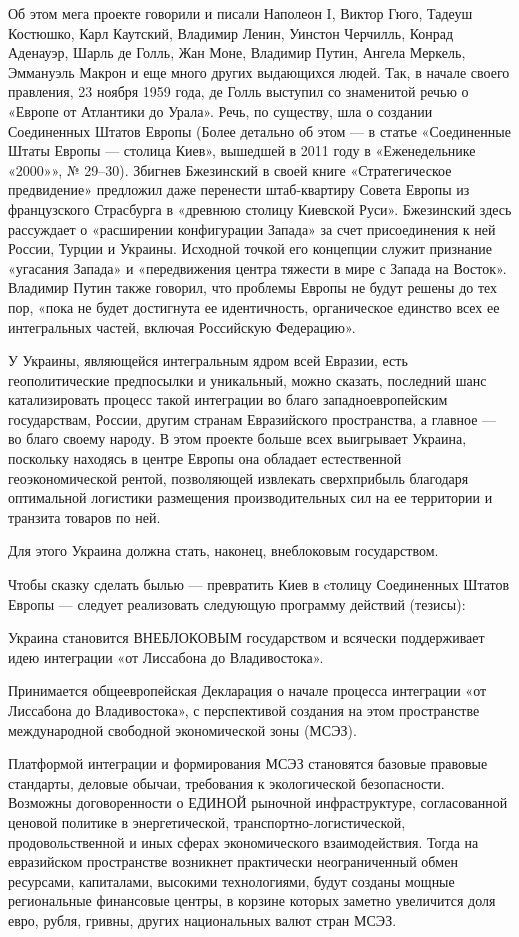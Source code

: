 Об этом мега проекте говорили и писали Наполеон I, Виктор Гюго, Тадеуш
Костюшко, Карл Каутский, Владимир Ленин, Уинстон Черчилль, Конрад Аденауэр,
Шарль де Голль, Жан Моне, Владимир Путин, Ангела Меркель, Эммануэль Макрон и
еще много других выдающихся людей. Так, в начале своего правления, 23 ноября
1959 года, де Голль выступил со знаменитой речью о «Европе от Атлантики до
Урала». Речь, по существу, шла о создании Соединенных Штатов Европы (Более
детально об этом — в статье «Соединенные Штаты Европы — столица Киев», вышедшей
в 2011 году в «Еженедельнике «2000»», № 29–30). Збигнев Бжезинский в своей
книге «Стратегическое предвидение» предложил даже перенести штаб-квартиру
Совета Европы из французского Страсбурга в «древнюю столицу Киевской Руси».
Бжезинский здесь рассуждает о «расширении конфигурации Запада» за счет
присоединения к ней России, Турции и Украины. Исходной точкой его концепции
служит признание «угасания Запада» и «передвижения центра тяжести в мире с
Запада на Восток». Владимир Путин также говорил, что проблемы Европы не будут
решены до тех пор, «пока не будет достигнута ее идентичность, органическое
единство всех ее интегральных частей, включая Российскую Федерацию».

У Украины, являющейся интегральным ядром всей Евразии, есть геополитические
предпосылки и уникальный, можно сказать, последний шанс катализировать процесс
такой интеграции во благо западноевропейским государствам, России, другим
странам Евразийского пространства, а главное — во благо своему народу. В этом
проекте больше всех выигрывает Украина, поскольку находясь в центре Европы она
обладает естественной геоэкономической рентой, позволяющей извлекать
сверхприбыль благодаря оптимальной логистики размещения производительных сил на
ее территории и транзита товаров по ней.

Для этого Украина должна стать, наконец, внеблоковым государством.

Чтобы сказку сделать былью — превратить Киев в cтолицу Соединенных Штатов
Европы — следует реализовать следующую программу действий (тезисы):

Украина становится ВНЕБЛОКОВЫМ государством и всячески поддерживает идею
интеграции «от Лиссабона до Владивостока».

Принимается общеевропейская Декларация о начале процесса интеграции «от
Лиссабона до Владивостока», с перспективой создания на этом пространстве
международной свободной экономической зоны (МСЭЗ).

Платформой интеграции и формирования МСЭЗ становятся базовые правовые
стандарты, деловые обычаи, требования к экологической безопасности. Возможны
договоренности о ЕДИНОЙ рыночной инфраструктуре, согласованной ценовой политике
в энергетической, транспортно-логистической, продовольственной и иных сферах
экономического взаимодействия. Тогда на евразийском пространстве возникнет
практически неограниченный обмен ресурсами, капиталами, высокими технологиями,
будут созданы мощные региональные финансовые центры, в корзине которых заметно
увеличится доля евро, рубля, гривны, других национальных валют стран МСЭЗ.


